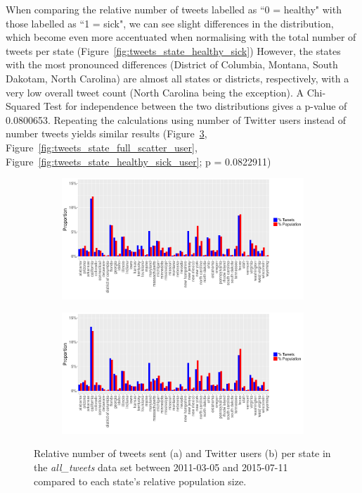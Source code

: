 \documentclass[11pt, a4paper,twoside]{report}\usepackage[]{graphicx}\usepackage[]{color}
\begin{document}
When comparing the relative number of tweets labelled as ``0 = healthy" with those labelled as ``1 = sick", we can see slight differences in the distribution, which become even more accentuated when normalising with the total number of tweets per state (Figure~\ref{fig:tweets_state_healthy_sick}) However, the states with the most pronounced differences (District of Columbia, Montana, South Dakotam, North Carolina) are almost all states or districts, respectively, with a very low overall tweet count (North Carolina being the exception). A Chi-Squared Test for independence between the two distributions gives a p-value of 0.0800653. Repeating the calculations using number of Twitter users instead of number tweets yields similar results (Figure~\ref{fig:tweets_state_full_user}, Figure~\ref{fig:tweets_state_full_scatter_user}, Figure~\ref{fig:tweets_state_healthy_sick_user}; p = 0.0822911)

\begin{figure}[H]
\centering
\begin{subfigure}[t]{1\textwidth}
  \includegraphics[width=1\linewidth]{activity_total_state_Twitter_full_aggregated.png}
  \caption{}
  \label{fig:tweets_state_full}
  \end{subfigure}
  
  \begin{subfigure}[t]{1\textwidth}
  \includegraphics[width=1\linewidth]{activity_total_user_state_Twitter_full_aggregated.png}
  \caption{}
    \label{fig:tweets_state_full_user}
  \end{subfigure}
\caption{Relative number of tweets sent (a) and Twitter users (b) per state in the \textit{all\_tweets} data set between 2011-03-05 and 2015-07-11 compared to each state's relative population size.}
\end{figure}
\end{document}
